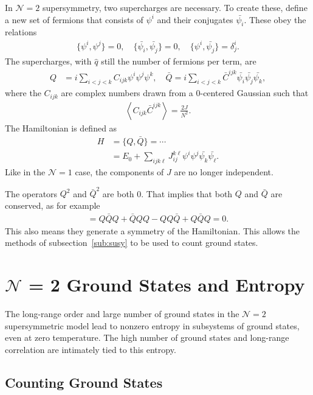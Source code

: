 \documentclass[12pt]{article} %
\renewcommand{\cal}{\mathcal}
\newcommand{\ex}[1]{\left\langle #1 \right\rangle}
\renewcommand{\l}{\ell}
\newcommand{\nn}{\nonumber\\}
\begin{document}
In $\cal N=2$ supersymmetry, two supercharges are necessary. To create these, define a new set of fermions that consists of $\psi^i$ and their conjugates $\bar{\psi_i}$. These obey the relations 
\begin{align}
\{\psi^i,\psi^j\} = 0, \quad \{\bar{\psi_i},\bar{\psi_j}\} = 0, \quad
	\{\psi^i,\bar{\psi_j}\} = \delta_j^i. \label{eqn:N2_ant}
\end{align}
The supercharges, with $\hat{q}$ still the number of fermions per term, are
\begin{align}
Q &= i\sum_{i<j<k}C_{ijk}\psi^i\psi^j\psi^k,\quad
\bar{Q} = i\sum_{i<j<k}\bar C^{ijk}\bar{\psi_i}\bar{\psi_j}\bar{\psi_k},
	\label{eqn:N2charge}
\end{align}
where the $C_{ijk}$ are complex numbers drawn from a 0-centered Gaussian such that
\begin{align}
\ex{C_{ijk}\bar C^{ijk}} = \frac{2J}{N^2}.
\end{align} 
The Hamiltonian is defined as 
\begin{align}
H &= \{Q, \bar Q\} = \cdots\nn
&= E_0 + \sum_{ijk\l}J_{ij}^{k\l}\psi^i\psi^j\bar{\psi_k}\bar{\psi_\l}.
\end{align}
Like in the $\cal N=1$ case, the components of $J$ are no longer independent. 

The operators $Q^2$ and $\bar Q^2$ are both 0. That implies that both $Q$ and $\bar Q$ are conserved, as for example
\begin{align}
[H,Q] = Q\bar QQ + \bar QQQ - QQ\bar Q + Q\bar QQ = 0.
\end{align}
This also means they generate a symmetry of the Hamiltonian. This allows the methods of subsection~\ref{sub:susy} to be used to count ground states.

\section{$\cal{N}$ = 2 Ground States and Entropy}

The long-range order and large number of ground states in the $\cal N = 2$ supersymmetric model lead to nonzero entropy in subsystems of ground states, even at zero temperature. The high number of ground states and long-range correlation are intimately tied to this entropy.

\subsection{Counting Ground States} \emph{}
\end{document}
